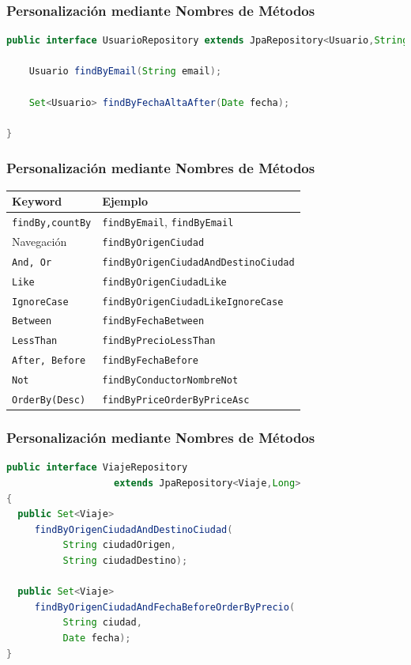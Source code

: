 \documentclass[handout,a4paper,slidestop,xcolor=pst,blue]{beamer}
\newcommand{\ann}[1]{\color{blue}\texttt{#1}\color{black}}
\begin{document}
\begin{frame}[c,fragile]
    \frametitle{Personalización mediante Nombres de Métodos}
\begin{lstlisting}[basicstyle=\footnotesize,language=Java]
public interface UsuarioRepository extends JpaRepository<Usuario,String> {
	
	Usuario findByEmail(String email);
	
	Set<Usuario> findByFechaAltaAfter(Date fecha);

}
\end{lstlisting}
\end{frame}

\begin{frame}[c,fragile]
    \frametitle{Personalización mediante Nombres de Métodos}
    \begin{center}
    \begin{tabular}{l|l}
    Keyword              & Ejemplo                                     \\ \hline
    \ann{findBy,countBy} & \texttt{findByEmail}, \texttt{findByEmail}  \\
    Navegación           & \texttt{findByOrigenCiudad}                 \\
    \ann{And, Or}        & \texttt{findByOrigenCiudadAndDestinoCiudad} \\
    \ann{Like}           & \texttt{findByOrigenCiudadLike}             \\
    \ann{IgnoreCase}     & \texttt{findByOrigenCiudadLikeIgnoreCase}   \\
    \ann{Between}        & \texttt{findByFechaBetween}           \\
    \ann{LessThan}       & \texttt{findByPrecioLessThan}         \\
    \ann{After, Before}  & \texttt{findByFechaBefore}            \\
    \ann{Not}            & \texttt{findByConductorNombreNot}     \\
    \ann{OrderBy(Desc)}  & \texttt{findByPriceOrderByPriceAsc}   \\
    \end{tabular}
    \end{center}
\end{frame}

\begin{frame}[c,fragile]
    \frametitle{Personalización mediante Nombres de Métodos}
\begin{lstlisting}[basicstyle=\footnotesize,language=Java]
public interface ViajeRepository
                   extends JpaRepository<Viaje,Long>
{
  public Set<Viaje>
     findByOrigenCiudadAndDestinoCiudad(
          String ciudadOrigen,
          String ciudadDestino);
	
  public Set<Viaje>
     findByOrigenCiudadAndFechaBeforeOrderByPrecio(
          String ciudad,
          Date fecha);
}
\end{lstlisting}
\end{frame}
\end{document}
